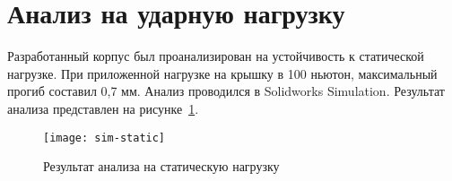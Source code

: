 \section{Анализ на ударную нагрузку}

Разработанный корпус был проанализирован на устойчивость к статической нагрузке. При
приложенной нагрузке на крышку в 100 ньютон, максимальный прогиб составил 0,7 мм.
Анализ проводился в Solidworks Simulation. Результат анализа представлен на
рисунке~\ref{pic:sim-static}.

\begin{figure}[h]
    \center
    \texttt{[image: sim-static]}
    \caption{Результат анализа на статическую нагрузку}
    \label{pic:sim-static}
\end{figure}


